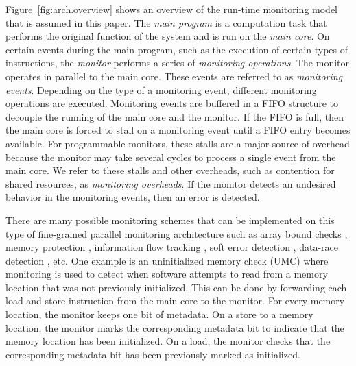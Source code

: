 Figure~\ref{fig:arch.overview} shows an overview of the run-time monitoring
model that is assumed in this paper. 
The \emph{main program} is a computation task that performs the original
function of the system and is run on the \emph{main core}.
On certain events
during the main program, such as the execution of certain types of
instructions, the \emph{monitor} performs a series of \emph{monitoring
operations}. The monitor operates in parallel to the main core. These events
are referred to as
\emph{monitoring events}. Depending on the type of a monitoring event, different
monitoring operations are executed. Monitoring events are buffered
in a FIFO
structure to decouple the running of the main core and the monitor. If the FIFO
is full, then the main core is forced to stall on a monitoring event until a
FIFO entry becomes available. For programmable monitors, these stalls are a
major source of overhead because the monitor may take several cycles to process
a single event from the main core. We refer to these stalls and other
overheads,
such as contention for shared resources, as
\emph{monitoring overheads}. If the monitor detects an %
undesired behavior in the monitoring events, then an error is detected. 

There are many possible monitoring schemes that can be implemented on this
type of fine-grained parallel monitoring architecture such as
array bound checks \cite{devietti-hardbound-asplos08}, memory protection \cite{mmp02}, 
information flow tracking \cite{suh-dift-asplos04, greathouse-testudo-micro08}, 
soft error detection \cite{argus-micro07}, data-race detection \cite{cord-hpca06}, etc.
One example is an
uninitialized memory check (UMC) where 
monitoring is used to detect when software attempts to read from a memory location that
was not previously initialized. This can be done by forwarding each load and store
instruction from the main core to the monitor.
For every memory location,
the monitor keeps one bit of metadata. On a store to a
memory location, the monitor marks the corresponding metadata bit to
indicate that the memory location has been initialized. On a load,
the monitor checks that the corresponding metadata bit has
been previously marked as initialized.

